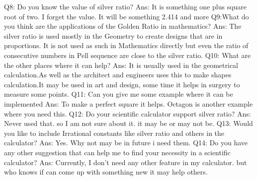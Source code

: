 Q8: Do you know the value of silver ratio?\newline
Ans: It is something one plus square root of two. I forget the value. It will be something 2.414 and more \newline\newline
Q9:What do you think are the applications of the Golden Ratio in mathematics?\newline
Ans: The silver ratio is used mostly in the Geometry to create designs that are in proportions. It is not used as such in Mathematics directly but even the ratio of consecutive numbers in Pell sequence are close to the silver ratio. \newline\newline
Q10: What are the other places where it can help?\newline
Ans: It is usually used in the geometrical calculation.As well as the architect and engineers uses this to make shapes calculation.It may be used in art and design, some time it helps in surgery to measure some points.  \newline\newline
Q11: Can you give me some example where it can be implemented\newline
Ans: To make a perfect square it helps. Octagon is another example where you need this.\newline\newline
Q12: Do your scientific calculator support silver ratio?\newline
Ans: Never used that. so I am not sure about it. it may be or may not be.\newline\newline
Q13: Would you like to include Irrational constants like silver ratio and others in the calculator? \newline
Ans: Yes. Why not may be in future i need them.\newline\newline
Q14: Do you have any other suggestion that can help me to find your necessity in a scientific calculator?\newline
Ans: Currently, I don't need any other feature in my calculator. but who knows if can come up with something new it may help others.\newline\newline

